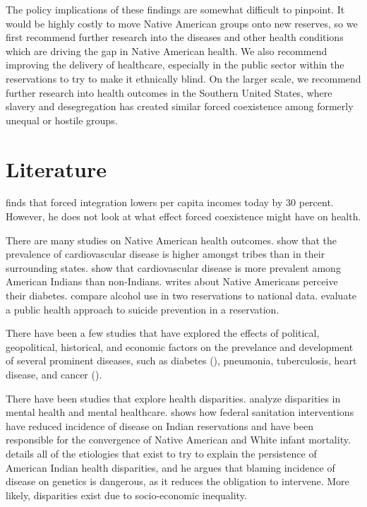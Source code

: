 \documentclass[12pt]{article}
\begin{document}
The policy implications of these findings are somewhat difficult to pinpoint.  
It would be highly costly to move Native American groups onto new reserves, so we first recommend further research into the diseases and other health conditions which are driving the gap in Native American health. 
We also recommend improving the delivery of healthcare, especially in the public sector within the reservations to try to make it ethnically blind. 
On the larger scale, we recommend further research into health outcomes in the Southern United States, where slavery and desegregation has created similar forced coexistence among formerly unequal or hostile groups.  


\section{Literature}
\cite{dippel2010forced} finds that forced integration lowers per capita incomes today by 30 percent. However, he does not look at what effect forced coexistence might have on health.

There are many studies on Native American health outcomes. 
\cite{levin2002geographic} show that the prevalence of cardiovascular disease is higher amongst tribes than in their surrounding states.
\cite{harwell2001cardiovascular} show that cardiovascular disease is more prevalent among American Indians than non-Indians.
\cite{patel2013health} writes about Native Americans perceive their diabetes.
\cite{beals2003racial} compare alcohol use in two reservations to national data.
\cite{may2005outcome} evaluate a public health approach to suicide prevention in a reservation.

There have been a few studies that have explored the effects of political, geopolitical, historical, and economic factors on the prevelance and development of several prominent diseases, such as diabetes (\cite{patchell2014role}), pneumonia, tuberculosis, heart disease, and cancer (\cite{heiner2014demographic}).

There have been studies that explore health disparities.
\cite{mcguire2008new} analyze disparities in mental health and mental healthcare.
\cite{watson2006public} shows how federal sanitation interventions have reduced incidence of disease on Indian reservations and have been responsible for the convergence of Native American and White infant mortality.
\cite{jones2006persistence} details all of the etiologies that exist to try to explain the persistence of American Indian health disparities, and he argues that blaming incidence of disease on genetics is dangerous, as it reduces the obligation to intervene. More likely, disparities exist due to socio-economic inequality.
\end{document}
